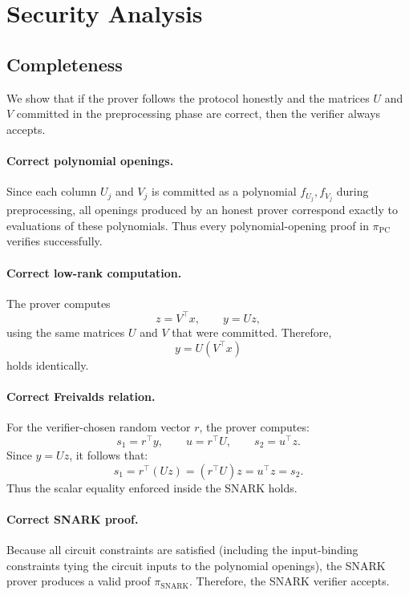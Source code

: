 \documentclass[11pt]{article}
\begin{document}
\section{Security Analysis}

\subsection{Completeness}

We show that if the prover follows the protocol honestly and the matrices
$U$ and $V$ committed in the preprocessing phase are correct, then the
verifier always accepts.

\paragraph{Correct polynomial openings.}
Since each column $U_j$ and $V_j$ is committed as a polynomial
$f_{U_j}, f_{V_j}$ during preprocessing, all openings produced by an
honest prover correspond exactly to evaluations of these polynomials.
Thus every polynomial-opening proof in $\pi_{\mathrm{PC}}$ verifies
successfully.

\paragraph{Correct low-rank computation.}
The prover computes
\[
  z = V^\top x,\qquad y = U z,
\]
using the same matrices $U$ and $V$ that were committed.
Therefore,
\[
  y = U(V^\top x)
\]
holds identically.

\paragraph{Correct Freivalds relation.}
For the verifier-chosen random vector $r$, the prover computes:
\[
  s_1 = r^\top y,
  \qquad
  u = r^\top U,
  \qquad
  s_2 = u^\top z.
\]
Since $y = U z$, it follows that:
\[
  s_1 = r^\top (U z)
      = (r^\top U) z
      = u^\top z
      = s_2.
\]
Thus the scalar equality enforced inside the SNARK holds.

\paragraph{Correct SNARK proof.}
Because all circuit constraints are satisfied (including the input-binding 
constraints tying the circuit inputs to the polynomial openings), the SNARK
prover produces a valid proof $\pi_{\mathrm{SNARK}}$.
Therefore, the SNARK verifier accepts.
\end{document}
